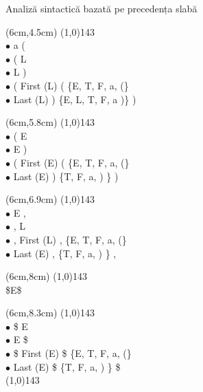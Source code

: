 \documentclass[pdf]{beamer}
\begin{document}
\begin{frame}{Analiză sintactică bazată pe precedența slabă}
\begin{textblock*}{16cm}(6cm,4.5cm) 
\tiny
\line(1,0){143} \\ 
$\bullet$ a {\color{red}{=}} ( \\
$\bullet$ ( {\color{red}{=}} L \\ 
$\bullet$ L {\color{red}{$=$}} )  \\
$\bullet$ ( {\color{red}{$<$}} First (L) \hspace{12mm} ( {\color{red}{$<$}} \{E, T, F, a, (\}  \\
$\bullet$ Last (L) {\color{red}{$>$}} )  \hspace{12mm} \{E, L, T, F, a )\} {\color{red}{$>$}} )
\end{textblock*}

\begin{textblock*}{16cm}(6cm,5.8cm) 
\tiny
\line(1,0){143} \\ 
$\bullet$ ( {\color{red}{=}} E \\
$\bullet$ E {\color{red}{=}} ) \\ 
$\bullet$ ( {\color{red}{$<$}} First (E) \hspace{12mm}  ( {\color{red}{$<$}} \{E, T, F, a, (\}\\
$\bullet$ Last (E) {\color{red}{$>$}} )  \hspace{12mm} \{T, F, a, ) \} {\color{red}{$>$}} )
\end{textblock*}

\begin{textblock*}{16cm}(6cm,6.9cm) 
\tiny
\line(1,0){143} \\ 
$\bullet$ E {\color{red}{=}} ,\\
$\bullet$ , {\color{red}{=}} L \\ 
$\bullet$ , {\color{red}{$<$}} First (L)  \hspace{12mm} , {\color{red}{$<$}} \{E, T, F, a, (\} \\
$\bullet$ Last (E) {\color{red}{$>$}} ,   \hspace{12mm} \{T, F, a, ) \} {\color{red}{$>$}} ,
\end{textblock*}

\begin{textblock*}{16cm}(6cm,8cm) 
\tiny
\line(1,0){143} \\ 
\tiny
\$E\$
\end{textblock*}

\begin{textblock*}{16cm}(6cm,8.3cm) 
\tiny
\line(1,0){143} \\ 
$\bullet$ \$ {\color{red}{=}} E \\
$\bullet$ E {\color{red}{=}} \$ \\ 
$\bullet$ \$ {\color{red}{$<$}} First (E) \hspace{12mm} \$ {\color{red}{$<$}} \{E, T, F, a, (\}   \\ 
$\bullet$ Last (E) {\color{red}{$>$}} \$  \hspace{12mm} \{T, F, a, ) \} {\color{red}{$>$}} \$ \\
\line(1,0){143} 
\end{textblock*}
\end{frame}
\end{document}
